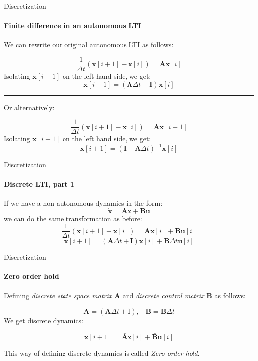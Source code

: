 \documentclass{beamer}
\begin{document}
\begin{frame}{Discretization}
\framesubtitle{Finite difference in an autonomous LTI}
\begin{flushleft}

We can rewrite our original autonomous LTI as follows:

\[
\frac{1}{\Delta t}(\mathbf x[i + 1] - \mathbf x[i]) = \mathbf A \mathbf x[i]
\]
Isolating $\mathbf x[i + 1]$ on the left hand side, we get:
\[
\mathbf x[i + 1] = (\mathbf A \Delta t + \mathbf I) \mathbf x[i]
\]

\noindent\rule{12cm}{0.4pt}

Or alternatively:

\[
\frac{1}{\Delta t}(\mathbf x[i + 1] - \mathbf x[i]) = \mathbf A \mathbf x[i + 1]
\]
Isolating $\mathbf x[i + 1]$ on the left hand side, we get:
\[
\mathbf x[i + 1] = (\mathbf I - \mathbf A \Delta t)^{-1} \mathbf x[i] 
\]

\end{flushleft}
\end{frame}

\begin{frame}{Discretization}
\framesubtitle{Discrete LTI, part 1}
\begin{flushleft}

If we have a non-autonomous dynamics in the form:
\[
\dot {\mathbf x} = \mathbf A \mathbf x + \mathbf B \mathbf u
\]
%
we can do the same transformation as before:
\[
\frac{1}{\Delta t}(\mathbf x[i + 1] - \mathbf x[i]) = \mathbf A \mathbf x[i] + \mathbf B \mathbf u[i]
\]
\[
\mathbf x[i + 1] = (\mathbf A \Delta t + \mathbf I) \mathbf x[i] + \mathbf B \Delta t \mathbf u[i]
\]

\end{flushleft}
\end{frame}


\begin{frame}{Discretization}
\framesubtitle{Zero order hold}
\begin{flushleft}

Defining \emph{discrete state space matrix} $\bar{\mathbf A}$ and \emph{discrete control matrix} $\bar{\mathbf B}$ as follows:

\[
\bar{\mathbf A} = (\mathbf A \Delta t + \mathbf I),\;  \; \; \bar{\mathbf B} = \mathbf B \Delta t
\]
%
We get discrete dynamics:

\[
\mathbf x[i + 1] = \bar{\mathbf A} \mathbf x[i] + \bar{\mathbf B} \mathbf u[i]
\]

This way of defining discrete dynamics is called \emph{Zero order hold}.

\end{flushleft}
\end{frame}
\end{document}
